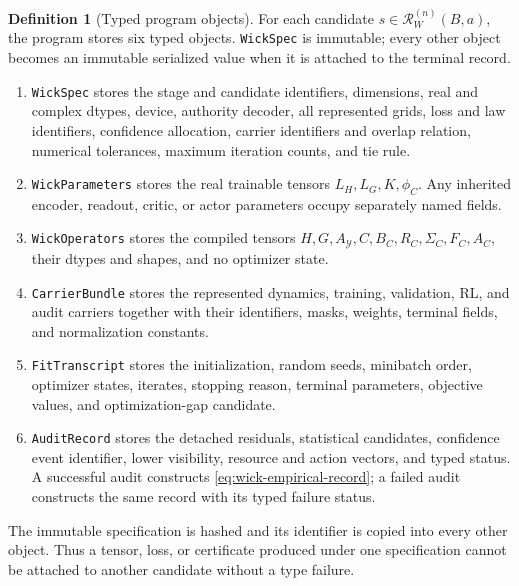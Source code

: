 \documentclass[11pt]{article}
\numberwithin{section}{part}
\theoremstyle{plain}
\theoremstyle{definition}
\newtheorem{definition}[definition]{Definition}
\theoremstyle{remark}
\begin{document}
\begin{definition}[Typed program objects]
\label{def:wick-typed-program-objects}
For each candidate \(s\in\mathscr R_W^{(n)}(B,a)\), the program stores six
typed objects.  \texttt{WickSpec} is immutable; every other object becomes an
immutable serialized value when it is attached to the terminal record.
\begin{enumerate}[label=\textup{(\roman*)}]
\item \texttt{WickSpec} stores the stage and candidate identifiers, dimensions,
      real and complex dtypes, device, authority decoder, all represented
      grids, loss and law identifiers, confidence allocation, carrier
      identifiers and overlap relation, numerical tolerances, maximum
      iteration counts, and tie rule.
\item \texttt{WickParameters} stores the real trainable tensors
      \(L_H,L_G,K,\phi_C\).  Any inherited encoder, readout, critic, or actor
      parameters occupy separately named fields.
\item \texttt{WickOperators} stores the compiled tensors
      \(H,G,A_{\mathcal Y},C,B_C,R_C,\Sigma_C,F_C,A_C\), their dtypes and
      shapes, and no optimizer state.
\item \texttt{CarrierBundle} stores the represented dynamics, training,
      validation, RL, and audit carriers together with their identifiers,
      masks, weights, terminal fields, and normalization constants.
\item \texttt{FitTranscript} stores the initialization, random seeds,
      minibatch order, optimizer states, iterates, stopping reason, terminal
      parameters, objective values, and optimization-gap candidate.
\item \texttt{AuditRecord} stores the detached residuals, statistical
      candidates, confidence event identifier, lower visibility, resource and
      action vectors, and typed status.  A successful audit constructs
      \eqref{eq:wick-empirical-record}; a failed audit constructs the same
      record with its typed failure status.
\end{enumerate}
The immutable specification is hashed and its identifier is copied into every
other object.  Thus a tensor, loss, or certificate produced under one
specification cannot be attached to another candidate without a type failure.
\end{definition}
\end{document}
